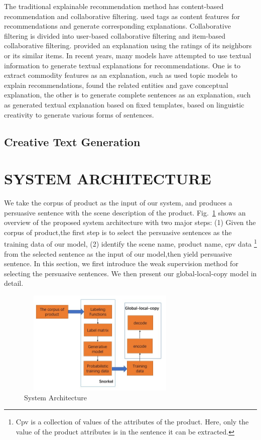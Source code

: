 \documentclass[sigconf]{acmart}
\begin{document}
The traditional explainable recommendation method has content-based recommendation and collaborative filtering. \cite{vig2009tagsplanations,sigurbjornsson2008flickr} used tags as content features for recommendations and generate corresponding explanations. Collaborative filtering is divided into user-based collaborative filtering and item-based collaborative filtering. \cite{herlocker2000explaining, gedikli2014should,sarwar2001item} provided an explanation using the ratings of its neighbors or its similar items. In recent years, many models have attempted to use textual information to generate textual explanations for recommendations. One is to extract commodity features as an explanation, such as \cite{wu2015flame} used topic models to explain recommendations, \cite{zhang2017entity} found the related entities and gave conceptual explanation, the other is to generate complete sentences as an explanation, such as \cite{ozbal2013brainsup} generated textual explanation based on fixed templates, \cite{munigala2018persuaide} based on linguistic creativity to generate various forms of sentences. 

\subsection{Creative Text Generation}


\section{SYSTEM ARCHITECTURE}\label{sec:architecture}
We take the corpus of product as the input of our system, and produces a persuasive sentence with the scene description of the product. Fig.~\ref{fig:system-architecture} shows an overview of the proposed system architecture with two major steps: (1) Given the corpus of product,the first step is to select the persuasive sentences as the training data of our model, (2) identify the scene name, product name, cpv data \footnote{Cpv is a collection of values of the attributes of the product. Here, only the value of the product attributes is in the sentence it can be extracted.} from the selected sentence as the input of our model,then yield persuasive sentence. In this section, we first introduce the weak supervision method for selecting the persuasive sentences. We then present our global-local-copy model in detail.  

\begin{figure}
    \centering
    \includegraphics[width=8cm,height=5cm]{system-architecture.jpg}
\caption{System Architecture}\label{fig:system-architecture}
\end{figure}
\end{document}
